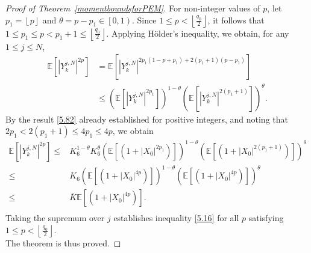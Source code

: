 \documentclass[12pt]{article}
\numberwithin{equation}{section}
\begin{document}
\begin{proof}[Proof of Theorem~\ref{momentboundsforPEM}]
For non-integer values of $p$, let $p_1 = \left\lfloor p \right\rfloor$ and $\theta = p - p_1 \in \left[ 0,1 \right)$. Since $1 \leq p < \left\lfloor \frac{q_0}{2} \right\rfloor$, it follows that $1 \leq p_1 \leq p < p_1 + 1 \leq \left\lfloor \frac{q_0}{2} \right\rfloor$. Applying H\"older's inequality, we obtain, for any $1 \leq j \leq N$,
\begin{equation}\tag{5.83}\label{5.666}
\begin{aligned}
    \mathbb{E} \left[ \left| Y_{k}^{j,N} \right|^{2p} \right] &=\mathbb{E} \left[ \left| Y_{k}^{j,N} \right|^{2p_1\left( 1-p+p_1 \right) +2\left( p_1+1 \right) \left( p-p_1 \right)} \right] 
\\
&\le \left( \mathbb{E} \left[ \left| Y_{k}^{j,N} \right|^{2p_1} \right] \right) ^{1-\theta}\left( \mathbb{E} \left[ \left| Y_{k}^{j,N} \right|^{2\left( p_1+1 \right)} \right] \right) ^{\theta}.
\end{aligned}
\end{equation}
By the result \eqref{5.82} already established for positive integers, and noting that $2p_1<2\left(p_1+1\right)\leq4p_1\leq4p$, we obtain
\begin{equation}\tag{5.84}\label{5.669}
\begin{aligned}
	\mathbb{E} \left[ \left| Y_{k}^{j,N} \right|^{2p} \right]
	\le& K_{6}^{1-\theta}K_{6}^{\theta}\left( \mathbb{E} \left[ \left( 1+\left| X_0 \right|^{2p_1} \right) \right] \right) ^{1-\theta}\left( \mathbb{E} \left[ \left( 1+\left| X_0 \right|^{2\left(p_1+1\right)} \right) \right] \right) ^{\theta}\\
    \le& K_{6}\left( \mathbb{E} \left[ \left( 1+\left| X_0 \right|^{4p} \right) \right] \right) ^{1-\theta}\left( \mathbb{E} \left[ \left( 1+\left| X_0 \right|^{4p} \right) \right] \right) ^{\theta}\\
	\le& \bar{K}\mathbb{E} \left[ \left( 1+\left| X_0 \right|^{4p} \right) \right] .\\
\end{aligned}
\end{equation}
Taking the supremum over $j$ establishes inequality \eqref{5.16} for all $p$ satisfying $1 \leq p < \left\lfloor \frac{q_0}{2} \right\rfloor$.\\
The theorem is thus proved.
\end{proof} 
\end{document}
